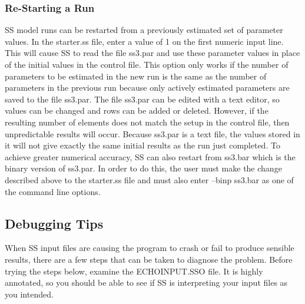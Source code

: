 \subsubsection{Re-Starting a Run}
SS model runs can be restarted from a previously estimated set of parameter values.  In the starter.ss file, enter a value of 1 on the first numeric input line.  This will cause SS to read the file ss3.par and use these parameter values in place of the initial values in the control file.  This option only works if the number of parameters to be estimated in the new run is the same as the number of parameters in the previous run because only actively estimated parameters are saved to the file ss3.par.  The file ss3.par can be edited with a text editor, so values can be changed and rows can be added or deleted.  However, if the resulting number of elements does not match the setup in the control file, then unpredictable results will occur.  Because ss3.par is a text file, the values stored in it will not give exactly the same initial results as the run just completed.  To achieve greater numerical accuracy, SS can also restart from ss3.bar which is the binary version of ss3.par.  In order to do this, the user must make the change described above to the starter.ss file and must also enter –binp ss3.bar as one of the command line options.

\subsection{Debugging Tips}
When SS input files are causing the program to crash or fail to produce sensible results, there are a few steps that can be taken to diagnose the problem.  Before trying the steps below, examine the ECHOINPUT.SSO file.  It is highly annotated, so you should be able to see if SS is interpreting your input files as you intended.

